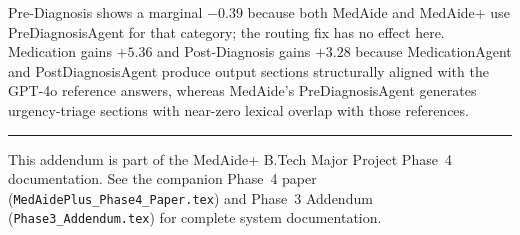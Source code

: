 \documentclass[a4paper,12pt]{article}
\begin{document}
Pre-Diagnosis shows a marginal $-0.39$ because both MedAide and MedAide+
use PreDiagnosisAgent for that category; the routing fix has no effect here.
Medication gains $+5.36$ and Post-Diagnosis gains $+3.28$ because MedicationAgent
and PostDiagnosisAgent produce output sections structurally aligned with the
GPT-4o reference answers, whereas MedAide's PreDiagnosisAgent generates
urgency-triage sections with near-zero lexical overlap with those references.

\vfill
\noindent\hrule\smallskip
\noindent\small This addendum is part of the MedAide+ B.Tech Major
Project Phase~4 documentation. See the companion Phase~4 paper
(\texttt{MedAidePlus\_Phase4\_Paper.tex}) and Phase~3 Addendum
(\texttt{Phase3\_Addendum.tex}) for complete system documentation.
\end{document}
